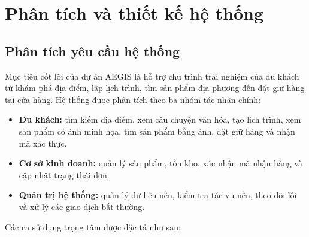 \documentclass[12pt, a4paper]{article}
\begin{document}
\clearpage
\section{Phân tích và thiết kế hệ thống}
\subsection{Phân tích yêu cầu hệ thống}
Mục tiêu cốt lõi của dự án AEGIS là hỗ trợ chu trình trải nghiệm của du khách từ khám phá địa điểm, lập lịch trình, tìm sản phẩm địa phương đến đặt giữ hàng tại cửa hàng. Hệ thống được phân tích theo ba nhóm tác nhân chính:

\begin{itemize}
    \item \textbf{Du khách:} tìm kiếm địa điểm, xem câu chuyện văn hóa, tạo lịch trình, xem sản phẩm có ảnh minh họa, tìm sản phẩm bằng ảnh, đặt giữ hàng và nhận mã xác thực.
    \item \textbf{Cơ sở kinh doanh:} quản lý sản phẩm, tồn kho, xác nhận mã nhận hàng và cập nhật trạng thái đơn.
    \item \textbf{Quản trị hệ thống:} quản lý dữ liệu nền, kiểm tra tác vụ nền, theo dõi lỗi và xử lý các giao dịch bất thường.
\end{itemize}

Các ca sử dụng trọng tâm được đặc tả như sau:
\end{document}
